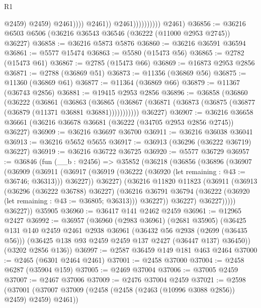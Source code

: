 \begin{lexlean}{R1}
\begin{coremodule}
                                          @2459)
                                        @2459)
                                      @2461))))
                              @2461))
                          @2461))))))))))
      @2461)
@36856 := @36216 @6503 @6506 (@36216 @36543 @36546 (@36222 (@11000 @2953 @2745)) @36227)
@36858 := @36216 @5873 @5876
@36860 := @36216 @36591 @36594
@36861 := @5577 @15474
@36863 := @5580 (@15473 @56)
@36865 := @2782 (@15473 @61)
@36867 := @2785 (@15473 @66)
@36869 := @16873 @2953 @2856
@36871 := @2788 (@36869 @51)
@36873 := @11356 (@36869 @56)
@36875 := @11360 (@36869 @61)
@36877 := @11364 (@36869 @66)
@36879 := @11367 (@36743 @2856)
@36881 := @19415 @2953 @2856
@36896 := @36858
    (@36860
      (@36222
        (@36861
          (@36863
            (@36865 (@36867 (@36871 (@36873 (@36875 (@36877 (@36879 (@11371 @36881 @36881)))))))))))
      @36227)
@36907 := @36216 @36658 @36661 (@36216 @36678 @36681 (@36222 (@34705 @2953 @2856 @2745)) @36227)
@36909 := @36216 @36697 @36700
@36911 := @36216 @36038 @36041
@36913 := @36216 @5652 @5655
@36917 := @36913 (@36296 (@36222 @36719) @36227)
@36919 := @36216 @36722 @36725
@36920 := @5577 @36729
@36957 := @36846
    (fun (__b : @2456) =>
    @35852
      (@36218
        (@36856
          (@36896
            (@36907
              (@36909
                (@36911
                  (@36917 (@36919 (@36222 (@36920 (let remaining : @43 := @36746; @36313))) @36227))
                  @36227)
                (@36216
                  @11820
                  @11823
                  (@36911
                    (@36913
                      (@36296 (@36222 @36788) @36227)
                      (@36216
                        @36791
                        @36794
                        (@36222 (@36920 (let remaining : @43 := @36805; @36313)))
                        @36227))
                    @36227)
                  @36227)))))
        @36227))
    @35905
@36960 := @36417 @141 @2462 @2459
@36961 := @12965 @2427
@36992 := @36957
    (@36960
      (@2983 @36961)
      (@2681 @35905)
      (@36425
        @131
        @140
        @2459
        @2461
        @2938
        @36961
        (@36432 @56 @2938 (@2699 (@36435 @56)))
        (@36425 @138 @93 @2459 @2459 @137 @2427 (@36447 @137) @36450))
      (@3202 @2856 @136))
@36997 := @2587 @36459 @149 @181 @463 @2464
@37000 := @2465 (@6301 @2464 @2461)
@37001 := @2458 @37000
@37004 := @2458 @6287 (@35904 @159)
@37005 := @2469 @37004
@37006 := @37005 @2459
@37007 := @2467 @37006
@37009 := @2476 @37004 @2459
@37021 := @2598
    (@37001 (@37007 @37009 (@2458 (@2458 (@2463 (@10996 @3088 @2856)) @2459) @2459) @2461))

\end{coremodule}
\end{lexlean}
